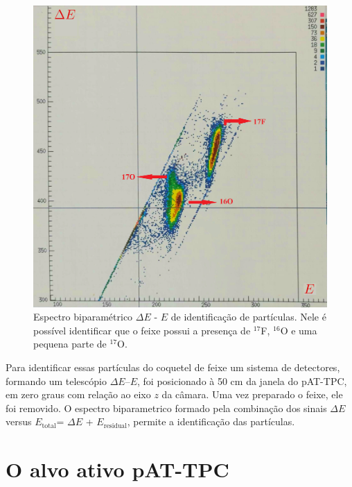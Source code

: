 \documentclass[a4paper,12pt,oneside]{book}
\begin{document}
\begin{figure}[H]
    \centering
    \includegraphics[scale = 0.12]{figs/pid_17F.png}
    \caption{Espectro biparamétrico $\Delta E$ - $E$ de identificação de partículas. Nele é possível identificar que o feixe possui a presença de $^{17}$F, $^{16}$O e uma pequena parte de $^{17}$O.}
    \label{fig:PID_17F}
\end{figure}

\par Para identificar essas partículas do coquetel de feixe um sistema de detectores, formando um telescópio $\Delta E$--$E$, foi posicionado à 50 cm da janela do pAT-TPC, em zero graus com relação ao eixo $z$ da câmara. Uma vez preparado o feixe, ele foi removido. O espectro biparametrico formado pela combinação dos sinais $\Delta E$ versus $E_{\mathrm{total}}$= $\Delta E$ + $E_{\mathrm{residual}}$, permite a identificação das partículas. 

\section{O alvo ativo pAT-TPC}

\end{document}
